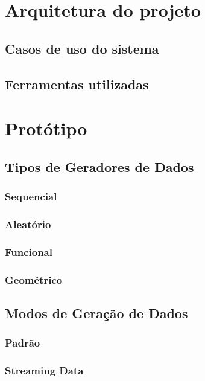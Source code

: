 \documentclass[
	12pt,				%
	openright,			%
	twoside,			%
	a4paper,			%
	english,			%
	brazil				%
	]{abntex2}
\begin{document}
\chapter{Arquitetura do projeto}\label{cap_trabalho_academico}

	\section{Casos de uso do sistema}
	\section{Ferramentas utilizadas}

\chapter{Protótipo}

	\section{Tipos de Geradores de Dados}

		\subsection{Sequencial}
		\subsection{Aleatório}
		\subsection{Funcional}
		\subsection{Geométrico}

	\section{Modos de Geração de Dados}

		\subsection{Padrão}
		\subsection{Streaming Data}
\end{document}
